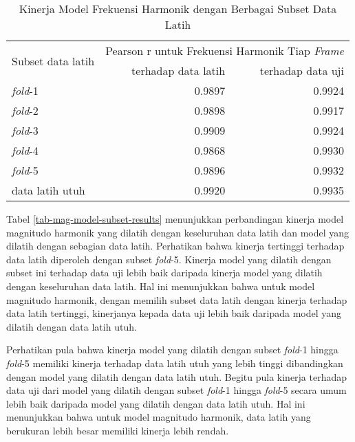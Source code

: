 \begin{table}[htbp]
    \centering
    \caption{Kinerja Model Frekuensi Harmonik dengan Berbagai Subset Data Latih}\label{tab-freq-model-subset-results}
    \begin{tabular}{ |l|r|r| } 
     \hline
     \multirow{2}{*}{Subset data latih} & \multicolumn{2}{l|}{Pearson r untuk Frekuensi Harmonik Tiap \textit{Frame}} \\
     \cline{2-3}
     & terhadap data latih & terhadap data uji \\\hline
	\textit{fold}-1      &0.9897  &0.9924\\\hline
	\textit{fold}-2      &0.9898  &0.9917\\\hline
	\textit{fold}-3      &0.9909  &0.9924\\\hline
	\textit{fold}-4      &0.9868  &0.9930\\\hline
	\textit{fold}-5      &0.9896  &0.9932\\\hline
	data latih utuh      &0.9920  &0.9935\\\hline
    \end{tabular}
\end{table}


Tabel \ref{tab-mag-model-subset-results} menunjukkan perbandingan kinerja model magnitudo harmonik yang dilatih dengan keseluruhan data latih dan model yang dilatih dengan sebagian data latih. Perhatikan bahwa kinerja tertinggi terhadap data latih diperoleh dengan subset \textit{fold}-5. Kinerja model yang dilatih dengan subset ini terhadap data uji lebih baik daripada kinerja model yang dilatih dengan keseluruhan data latih. Hal ini menunjukkan bahwa untuk model magnitudo harmonik, dengan memilih subset data latih dengan kinerja terhadap data latih tertinggi, kinerjanya kepada data uji lebih baik daripada model yang dilatih dengan data latih utuh. 

Perhatikan pula bahwa kinerja model yang dilatih dengan subset \textit{fold}-1 hingga \textit{fold}-5 memiliki kinerja terhadap data latih utuh yang lebih tinggi dibandingkan dengan model yang dilatih dengan data latih utuh. Begitu pula kinerja terhadap data uji dari model yang dilatih dengan subset \textit{fold}-1 hingga \textit{fold}-5 secara umum lebih baik daripada model yang dilatih dengan data latih utuh. Hal ini menunjukkan bahwa untuk model magnitudo harmonik, data latih yang berukuran lebih besar memiliki kinerja lebih rendah.

